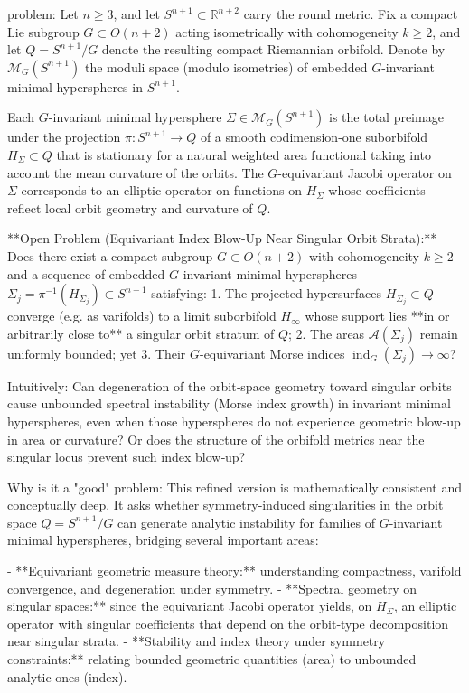 problem:  
Let \( n \ge 3 \), and let \( S^{n+1} \subset \mathbb{R}^{n+2} \) carry the round metric.  
Fix a compact Lie subgroup \( G \subset O(n+2) \) acting isometrically with cohomogeneity \( k \ge 2 \), and let \( Q = S^{n+1}/G \) denote the resulting compact Riemannian orbifold.  
Denote by \( \mathcal{M}_G(S^{n+1}) \) the moduli space (modulo isometries) of embedded \(G\)-invariant minimal hyperspheres in \( S^{n+1} \).

Each \(G\)-invariant minimal hypersphere \(\Sigma \in \mathcal{M}_G(S^{n+1})\) is the total preimage under the projection \(\pi:S^{n+1} \to Q\) of a smooth codimension-one suborbifold \(H_\Sigma \subset Q\) that is stationary for a natural weighted area functional taking into account the mean curvature of the orbits.  
The \(G\)-equivariant Jacobi operator on \(\Sigma\) corresponds to an elliptic operator on functions on \(H_\Sigma\) whose coefficients reflect local orbit geometry and curvature of \(Q\).

**Open Problem (Equivariant Index Blow-Up Near Singular Orbit Strata):**  
Does there exist a compact subgroup \( G \subset O(n+2) \) with cohomogeneity \( k \ge 2 \) and a sequence of embedded \( G \)-invariant minimal hyperspheres \(\Sigma_j = \pi^{-1}(H_{\Sigma_j}) \subset S^{n+1}\) satisfying:  
1. The projected hypersurfaces \( H_{\Sigma_j} \subset Q \) converge (e.g. as varifolds) to a limit suborbifold \(H_\infty\) whose support lies **in or arbitrarily close to** a singular orbit stratum of \(Q\);  
2. The areas \( \mathcal{A}(\Sigma_j) \) remain uniformly bounded; yet  
3. Their \(G\)-equivariant Morse indices \( \operatorname{ind}_G(\Sigma_j) \to \infty \)?  

Intuitively: Can degeneration of the orbit‑space geometry toward singular orbits cause unbounded spectral instability (Morse index growth) in invariant minimal hyperspheres, even when those hyperspheres do not experience geometric blow-up in area or curvature?  
Or does the structure of the orbifold metrics near the singular locus prevent such index blow‑up?

Why is it a "good" problem:  
This refined version is mathematically consistent and conceptually deep.  
It asks whether symmetry‑induced singularities in the orbit space \(Q=S^{n+1}/G\) can generate analytic instability for families of \(G\)-invariant minimal hyperspheres, bridging several important areas:

- **Equivariant geometric measure theory:** understanding compactness, varifold convergence, and degeneration under symmetry.
- **Spectral geometry on singular spaces:** since the equivariant Jacobi operator yields, on \(H_\Sigma\), an elliptic operator with singular coefficients that depend on the orbit‑type decomposition near singular strata.
- **Stability and index theory under symmetry constraints:** relating bounded geometric quantities (area) to unbounded analytic ones (index).

